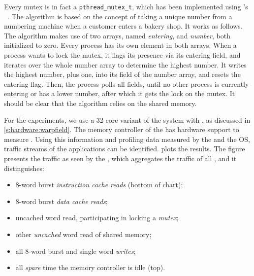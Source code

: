 
Every mutex is in fact a \lstinline|pthread_mutex_t|, which has been implemented using \citeauthor{lamport:mutex}'s ~\cite{lamport:mutex}.
The algorithm is based on the concept of taking a unique number from a numbering machine when a customer enters a bakery shop.
It works as follows.
The algorithm makes use of two arrays, named \emph{entering}, and \emph{number}, both initialized to zero.
Every process has its own element in both arrays.
When a process wants to lock the mutex, it flags its presence via its entering field, and iterates over the whole number array to determine the highest number.
It writes the highest number, plus one, into its field of the number array, and resets the entering flag.
Then, the process polls all fields, until no other process is currently entering or has a lower number, after which it gets the lock on the mutex.
It should be clear that the algorithm relies on  the shared memory.

For the experiments, we use a 32-core variant of the system with \Warpfield*, as discussed in \cref{s:hardware:warpfield}.
The memory controller of the  has hardware support to measure .
Using this information and profiling data measured by the \MicroBlaze and the \ac{OS}, traffic streams of the applications can be identified.
 plots the results.
The figure presents the traffic as seen by the , which aggregates the traffic of all \MicroBlazes, and it distinguishes:
\begin{itemize}
\item 8-word burst \emph{instruction cache reads} (bottom of chart);
\item 8-word burst \emph{data cache reads};
\item uncached word read, participating in locking a \emph{mutex};
\item other \emph{uncached} word read of shared memory;
\item all 8-word burst and single word \emph{writes};
\item all \emph{spare} time the memory controller is idle (top).
\end{itemize}

